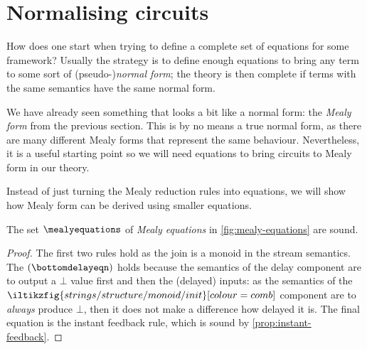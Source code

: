 \section{Normalising circuits}\label{sec:normalising}

How does one start when trying to define a complete set of equations for some
framework?
Usually the strategy is to define enough equations to bring any term to some
sort of (pseudo-)\emph{normal form}; the theory is then complete if terms with
the same semantics have the same normal form.

We have already seen something that looks a bit like a normal form: the
\emph{Mealy form} from the previous section.
This is by no means a true normal form, as there are many different Mealy forms
that represent the same behaviour.
Nevertheless, it is a useful starting point so we will need equations to bring
circuits to Mealy form in our theory.

Instead of just turning the Mealy reduction rules into equations, we will show
how Mealy form can be derived using smaller equations.



\begin{definition}
    The set \(\mealyequations\) of \emph{Mealy equations} in
    \cref{fig:mealy-equations} are sound.
\end{definition}
\begin{proof}
    The first two rules hold as the join is a monoid in the stream semantics.
    The \((\bottomdelayeqn)\) holds because the semantics of the delay
    component are to output a \(\bot\) value first and then the (delayed)
    inputs: as the semantics of the \(
    \iltikzfig{strings/structure/monoid/init}[colour=comb]
    \) component are to \emph{always} produce \(\bot\), then it does not make a
    difference how delayed it is.
    The final equation is the instant feedback rule, which is sound by
    \cref{prop:instant-feedback}.
\end{proof}

